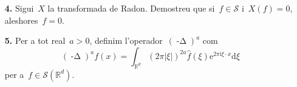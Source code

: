 \documentclass[a4paper]{article}
\theoremstyle{plain}
\theoremstyle{definition}
\newcommand{\iu}{\mathrm{i}}
\newcommand{\e}{\mathrm{e}}
\providecommand{\uppi}{\pi}
\newcommand{\diff}{\mathrm{d}}
\newcommand{\abs}[1]{\lvert{#1}\rvert}
\newcommand{\Sc}{\mathcal{S}}
\newcommand{\RR}{\mathbb{R}}
\DeclareMathOperator{\mlap}{-\Delta}
\begin{document}
\begin{enumerate}
    \item[\textbf{4.}] Sigui~\(X\) la transformada de Radon. Demostreu que
        si~\(f\in\Sc\) i~\(X(f)=0\), aleshores~\(f=0\).
\end{enumerate}

\begin{enumerate}
    \item[\textbf{5.}] Per a tot real~\(a>0\), definim
        l'operador~\((\mlap)^{a}\) com
        \[
            (\mlap)^{a}f(x)
            =
            \int_{\RR^{d}}
            (2\uppi\abs{\xi})^{2a}
            \widehat{f}(\xi)
            \e^{2\uppi\iu\xi\cdot x}
            \diff\xi
        \]
        per a~\(f\in\Sc(\RR^{d})\).
\end{enumerate}
\end{document}
